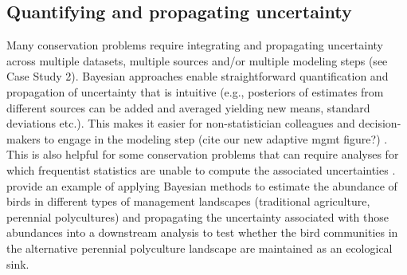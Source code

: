 \documentclass{article}
\begin{document}
\subsection*{Quantifying and propagating uncertainty} 
\par  Many conservation problems require integrating and propagating uncertainty across multiple datasets, multiple sources and/or multiple modeling steps (see Case Study 2). Bayesian approaches enable straightforward quantification and  propagation of  uncertainty \citep[e.g.,][]{stern2022interweaving, draper1995assessment,gilbert2023propagating} that is intuitive (e.g., posteriors of estimates from different sources can be added and averaged yielding new means, standard deviations etc.). This makes it easier for non-statistician colleagues and decision-makers to engage in the modeling step (cite our new adaptive mgmt figure?) \citep{fornacon2021bayesian}. This is also helpful for some conservation problems that can require analyses for which frequentist statistics are unable to compute the associated uncertainties \citep{bolker2009a,bates2006r}.  \cite{Eyster2022} provide an example of applying Bayesian methods to estimate the abundance of birds in different types of management landscapes (traditional agriculture, perennial polycultures) and propagating the uncertainty associated with those abundances into a downstream analysis to test whether the bird communities in the alternative perennial polyculture landscape are maintained as an ecological sink. 
\end{document}
